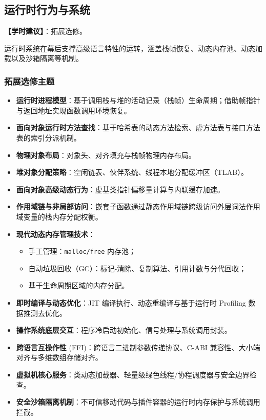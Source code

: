 \subsection{运行时行为与系统}
\textbf{【学时建议】}：拓展选修。

运行时系统在幕后支撑高级语言特性的运转，涵盖栈帧恢复、动态内存池、动态加载以及沙箱隔离等机制。

\subsubsection{拓展选修主题}
\begin{itemize}
    \item \textbf{运行时进程模型}：基于调用栈与堆的活动记录（栈帧）生命周期；借助帧指针与返回地址实现函数调用环境恢复。
    \item \textbf{面向对象运行时方法查找}：基于哈希表的动态方法检索、虚方法表与接口方法表的索引分派机制。
    \item \textbf{物理对象布局}：对象头、对齐填充与栈帧物理内存布局。
    \item \textbf{堆对象分配策略}：空闲链表、伙伴系统、线程本地分配缓冲区（TLAB）。
    \item \textbf{面向对象高级动态行为}：虚基类指针偏移量计算与内联缓存加速。
    \item \textbf{作用域链与非局部访问}：嵌套子函数通过静态作用域链跨级访问外层词法作用域变量的栈内存分配权衡。
    \item \textbf{现代动态内存管理技术}：
    \begin{itemize}
        \item 手工管理：\texttt{malloc/free} 内存池；
        \item 自动垃圾回收（GC）：标记-清除、复制算法、引用计数与分代回收；
        \item 基于生命周期区域的内存分配。
    \end{itemize}
    \item \textbf{即时编译与动态优化}：JIT 编译执行、动态重编译与基于运行时 Profiling 数据推测去优化。
    \item \textbf{操作系统底层交互}：程序冷启动初始化、信号处理与系统调用封装。
    \item \textbf{跨语言互操作性} (FFI)：跨语言二进制参数传递协议、C-ABI 兼容性、大小端对齐与多维数组存储对齐。
    \item \textbf{虚拟机核心服务}：类动态加载器、轻量级绿色线程/协程调度器与安全边界检查。
    \item \textbf{安全沙箱隔离机制}：不可信移动代码与插件容器的运行时内存保护与系统调用拦截。
\end{itemize}

